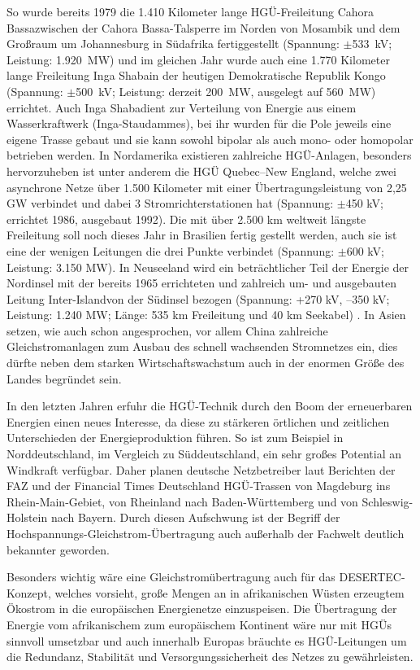 So wurde bereits 1979 die 1.410 Kilometer lange HGÜ-Freileitung \q Cahora Bassa\qe zwischen der Cahora Bassa-Talsperre im Norden von Mosambik und dem Großraum um Johannesburg in Südafrika fertiggestellt (Spannung: $\pm$533\ kV; Leistung: 1.920\ MW)
und im gleichen Jahr wurde auch eine 1.770 Kilometer lange Freileitung \q Inga Shaba\qe in der heutigen Demokratische Republik Kongo (Spannung: $\pm$500\ kV; Leistung: derzeit 200\ MW, ausgelegt auf 560\ MW) errichtet\cite{Schymroch}.
Auch \q Inga Shaba\qe dient zur Verteilung von Energie aus einem Wasserkraftwerk (Inga-Staudammes),
bei ihr wurden für die Pole jeweils eine eigene Trasse gebaut und sie kann sowohl bipolar als auch mono- oder homopolar betrieben werden\cite{Schymroch}.
In Nordamerika existieren zahlreiche HGÜ-Anlagen, besonders hervorzuheben ist unter anderem die HGÜ Quebec–New England, welche zwei asynchrone Netze über 1.500 Kilometer mit einer Übertragungsleistung von 2,25 GW verbindet und dabei 3 Stromrichterstationen hat (Spannung: $\pm$450 kV; errichtet 1986, ausgebaut 1992)\cite{Liste}.
Die mit über 2.500 km weltweit längste Freileitung soll noch dieses Jahr in Brasilien fertig gestellt werden, auch sie ist eine der wenigen Leitungen die drei Punkte verbindet (Spannung: $\pm$600 kV; Leistung: 3.150 MW). %
In Neuseeland wird ein beträchtlicher Teil der Energie der Nordinsel mit der bereits 1965 errichteten und zahlreich um- und ausgebauten Leitung \q Inter-Island\qe von der Südinsel bezogen (Spannung: +270 kV, --350 kV; Leistung: 1.240 MW; Länge: 535 km Freileitung und 40 km Seekabel) \cite{Schymroch}\cite{Liste}.
In Asien setzen, wie auch schon angesprochen, vor allem China zahlreiche Gleichstromanlagen zum Ausbau des schnell wachsenden Stromnetzes ein, dies dürfte neben dem starken Wirtschaftswachstum auch in der enormen Größe des Landes begründet sein.

In den letzten Jahren erfuhr die HGÜ-Technik durch den Boom der erneuerbaren Energien einen neues Interesse, da diese zu stärkeren örtlichen und zeitlichen Unterschieden der Energieproduktion führen.
So ist zum Beispiel in Norddeutschland, im Vergleich zu Süddeutschland, ein sehr großes Potential an Windkraft verfügbar. Daher planen deutsche Netzbetreiber laut Berichten der FAZ und der Financial Times Deutschland HGÜ-Trassen von Magdeburg ins Rhein-Main-Gebiet, von Rheinland nach Baden-Württemberg und von Schleswig-Holstein nach Bayern.\cite{FAZ1}\cite{FAZ2}\cite{FinancialTimes}
Durch diesen Aufschwung ist der Begriff der Hochspannungs-Gleichstrom-Übertragung auch außerhalb der Fachwelt deutlich bekannter geworden.

Besonders wichtig wäre eine Gleichstromübertragung auch für das DESERTEC-Konzept, welches vorsieht, große Mengen an in afrikanischen Wüsten erzeugtem Ökostrom in die europäischen Energienetze einzuspeisen. Die Übertragung der Energie vom afrikanischem zum europäischem Kontinent wäre nur mit HGÜs sinnvoll umsetzbar und auch innerhalb Europas bräuchte es HGÜ-Leitungen um die Redundanz, Stabilität und Versorgungssicherheit des Netzes zu gewährleisten.\cite{TRANS-CSP}

